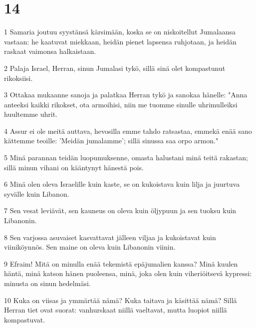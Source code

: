 \chapter{14}

\par 1 Samaria joutuu syystänsä kärsimään, koska se on niskoitellut Jumalaansa vastaan: he kaatuvat miekkaan, heidän pienet lapsensa ruhjotaan, ja heidän raskaat vaimonsa halkaistaan.
\par 2 Palaja Israel, Herran, sinun Jumalasi tykö, sillä sinä olet kompastunut rikoksiisi.
\par 3 Ottakaa mukaanne sanoja ja palatkaa Herran tykö ja sanokaa hänelle: "Anna anteeksi kaikki rikokset, ota armoihisi, niin me tuomme sinulle uhrimulleiksi huultemme uhrit.
\par 4 Assur ei ole meitä auttava, hevosilla emme tahdo ratsastaa, emmekä enää sano kättemme teoille: 'Meidän jumalamme'; sillä sinussa saa orpo armon."
\par 5 Minä parannan teidän luopumuksenne, omasta halustani minä teitä rakastan; sillä minun vihani on kääntynyt hänestä pois.
\par 6 Minä olen oleva Israelille kuin kaste, se on kukoistava kuin lilja ja juurtuva syvälle kuin Libanon.
\par 7 Sen vesat leviävät, sen kauneus on oleva kuin öljypuun ja sen tuoksu kuin Libanonin.
\par 8 Sen varjossa asuvaiset kasvattavat jälleen viljaa ja kukoistavat kuin viiniköynnös. Sen maine on oleva kuin Libanonin viinin.
\par 9 Efraim! Mitä on minulla enää tekemistä epäjumalien kanssa? Minä kuulen häntä, minä katson hänen puoleensa, minä, joka olen kuin viheriöitsevä kypressi: minusta on sinun hedelmäsi.
\par 10 Kuka on viisas ja ymmärtää nämä? Kuka taitava ja käsittää nämä? Sillä Herran tiet ovat suorat: vanhurskaat niillä vaeltavat, mutta luopiot niillä kompastuvat.


